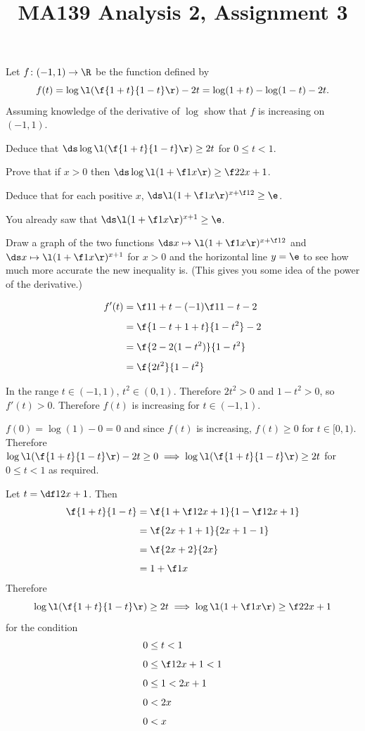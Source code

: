 \documentclass[a4paper]{article}
\title{MA139 Analysis 2, Assignment 3}
\begin{document}
\maketitle

\setlength{\parindent}{0em}
\setlength{\parskip}{1em}


\begin{questionbody}
Let $f \colon (-1, 1) \to \R$ be the function defined by \[
f(t) = \log\l( \f{1+t}{1-t} \r) - 2t = \log(1+t) - \log(1-t) - 2t.
\] Assuming knowledge of the derivative of $\log$ show that $f$ is increasing on $(-1, 1)$.

Deduce that $\ds\log\l( \f{1+t}{1-t} \r) \ge 2t$ for $0 \le t < 1$.

Prove that if $x > 0$ then $\ds\log\l( 1 + \f1x \r) \ge \f2{2x+1}$.

Deduce that for each positive $x$, $\ds\l( 1 + \f1x \r)^{x + \f12} \ge \e$.

You already saw that $\ds\l( 1 + \f1x \r)^{x + 1} \ge \e$.

Draw a graph of the two functions $\ds x \mapsto \l( 1 + \f1x \r)^{x + \f12}$ and $\ds x \mapsto \l( 1 + \f1x \r)^{x + 1}$ for $x > 0$ and the horizontal line $y = \e$ to see how much more accurate the new inequality is. (This gives you some idea of the power of the derivative.)
\end{questionbody}

\begin{align*}
f'(t) &= \f1{1+t} - (-1)\f1{1-t} - 2\\[1ex]
&= \f{1-t + 1+t}{1-t^2} - 2\\[1ex]
&= \f{2 - 2(1-t^2)}{1-t^2}\\[1ex]
&= \f{2t^2}{1-t^2}
\end{align*}

In the range $t \in (-1, 1)$, $t^2 \in (0, 1)$. Therefore $2t^2 > 0$ and $1 - t^2 > 0$, so $f'(t) > 0$. Therefore $f(t)$ is increasing for $t \in (-1, 1)$.

$f(0) = \log(1) - 0 = 0$ and since $f(t)$ is increasing, $f(t) \ge 0$ for $t \in [0, 1)$. Therefore $\log\l( \f{1+t}{1-t} \r) - 2t \ge 0 \implies \log\l( \f{1+t}{1-t} \r) \ge 2t$ for $0 \le t < 1$ as required.

Let $t = \df1{2x+1}$. Then \begin{align*}
\f{1+t}{1-t} &= \f{1 + \f1{2x+1}}{1 - \f1{2x+1}}\\[1ex]
&= \f{2x + 1 + 1}{2x + 1 - 1}\\[1ex]
&= \f{2x + 2}{2x}\\[1ex]
&= 1 + \f1x
\end{align*}
Therefore $$\log\l( \f{1+t}{1-t} \r) \ge 2t \implies \log\l( 1 + \f1x \r) \ge \f2{2x+1}$$
for the condition \begin{align*}
0 &\le t < 1\\[1ex]
0 &\le \f1{2x+1} < 1\\[1ex]
0 &\le 1 < 2x + 1\\[1ex]
0 &< 2x\\[1ex]
0 &< x\\[1ex]
\end{align*}
\end{document}
